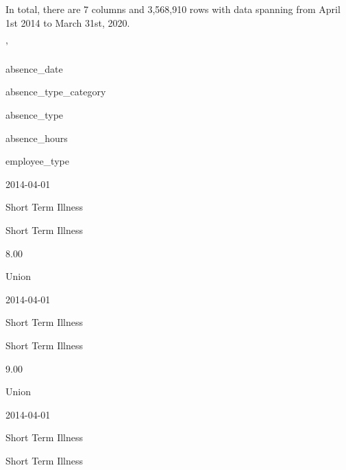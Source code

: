 \documentclass[
]{article}
\begin{document}
In total, there are 7 columns and 3,568,910 rows with data spanning from
April 1st 2014 to March 31st, 2020.

'

\n  

\n    

\n      

absence\_date

\n      

absence\_type\_category

\n      

absence\_type

\n      

absence\_hours

\n      

employee\_type

\n    

\n  

\n  

\n    

\n      

2014-04-01

\n      

Short Term Illness

\n      

Short Term Illness

\n      

8.00

\n      

Union

\n    

\n    

\n      

2014-04-01

\n      

Short Term Illness

\n      

Short Term Illness

\n      

9.00

\n      

Union

\n    

\n    

\n      

2014-04-01

\n      

Short Term Illness

\n      

Short Term Illness

\n      
\end{document}
